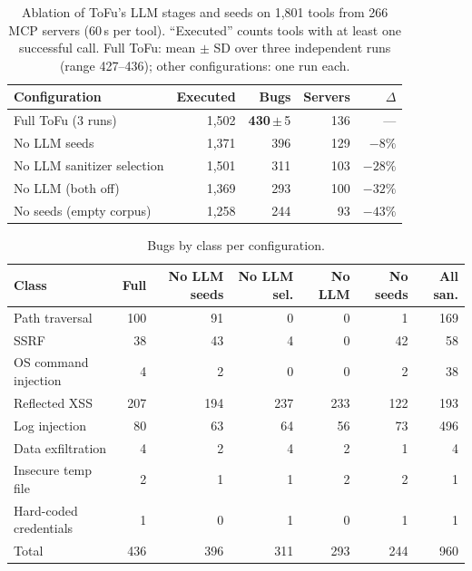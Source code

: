 
\begin{table}[t]
\centering
\caption{Ablation of ToFu's LLM stages and seeds on 1,801 tools from 266 MCP servers (60\,s per tool).
``Executed'' counts tools with at least one successful call. Full ToFu: mean $\pm$ SD over three
independent runs (range 427--436); other configurations: one run each.}
\label{tab:ablation-stages}
\small
\begin{tabular}{lrrrr}
\toprule
Configuration & Executed & Bugs & Servers & $\Delta$ \\
\midrule
Full ToFu (3 runs)           & 1,502 & \textbf{430}\,$\pm$\,5 & 136 & --- \\
No LLM seeds                 & 1,371 & 396 & 129 & $-8\%$ \\
No LLM sanitizer selection   & 1,501 & 311 & 103 & $-28\%$ \\
No LLM (both off)            & 1,369 & 293 & 100 & $-32\%$ \\
No seeds (empty corpus)      & 1,258 & 244 &  93 & $-43\%$ \\
\bottomrule
\end{tabular}
\end{table}

\begin{table}[t]
\centering
\caption{Bugs by class per configuration.}
\label{tab:ablation-classes}
\small
\begin{tabular}{lrrrrrr}
\toprule
Class & Full & No LLM seeds & No LLM sel. & No LLM & No seeds & All san. \\
\midrule
Path traversal         & 100 &  91 &   0 &   0 &   1 & 169 \\
SSRF                   &  38 &  43 &   4 &   0 &  42 &  58 \\
OS command injection   &   4 &   2 &   0 &   0 &   2 &  38 \\
Reflected XSS          & 207 & 194 & 237 & 233 & 122 & 193 \\
Log injection          &  80 &  63 &  64 &  56 &  73 & 496 \\
Data exfiltration      &   4 &   2 &   4 &   2 &   1 &   4 \\
Insecure temp file     &   2 &   1 &   1 &   2 &   2 &   1 \\
Hard-coded credentials &   1 &   0 &   1 &   0 &   1 &   1 \\
\midrule
Total                  & 436 & 396 & 311 & 293 & 244 & 960 \\
\bottomrule
\end{tabular}
\end{table}

